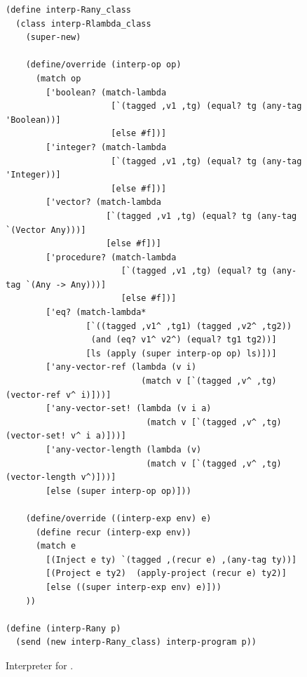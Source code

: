 \documentclass[7x10,nocrop]{TimesAPriori_MIT}%
\begin{document}
\begin{figure}[btp]
\begin{lstlisting}
(define interp-Rany_class
  (class interp-Rlambda_class
    (super-new)

    (define/override (interp-op op)
      (match op
        ['boolean? (match-lambda
                     [`(tagged ,v1 ,tg) (equal? tg (any-tag 'Boolean))]
                     [else #f])]
        ['integer? (match-lambda
                     [`(tagged ,v1 ,tg) (equal? tg (any-tag 'Integer))]
                     [else #f])]
        ['vector? (match-lambda
                    [`(tagged ,v1 ,tg) (equal? tg (any-tag `(Vector Any)))]
                    [else #f])]
        ['procedure? (match-lambda
                       [`(tagged ,v1 ,tg) (equal? tg (any-tag `(Any -> Any)))]
                       [else #f])]
        ['eq? (match-lambda*
                [`((tagged ,v1^ ,tg1) (tagged ,v2^ ,tg2))
                 (and (eq? v1^ v2^) (equal? tg1 tg2))]
                [ls (apply (super interp-op op) ls)])]
        ['any-vector-ref (lambda (v i)
                           (match v [`(tagged ,v^ ,tg) (vector-ref v^ i)]))]
        ['any-vector-set! (lambda (v i a)
                            (match v [`(tagged ,v^ ,tg) (vector-set! v^ i a)]))]
        ['any-vector-length (lambda (v)
                            (match v [`(tagged ,v^ ,tg) (vector-length v^)]))]
        [else (super interp-op op)]))

    (define/override ((interp-exp env) e)
      (define recur (interp-exp env))
      (match e
        [(Inject e ty) `(tagged ,(recur e) ,(any-tag ty))]
        [(Project e ty2)  (apply-project (recur e) ty2)]
        [else ((super interp-exp env) e)]))
    ))

(define (interp-Rany p)
  (send (new interp-Rany_class) interp-program p))
\end{lstlisting}
\caption{Interpreter for \LangAny{}.}
\label{fig:interp-Rany}
\end{figure}
\end{document}

